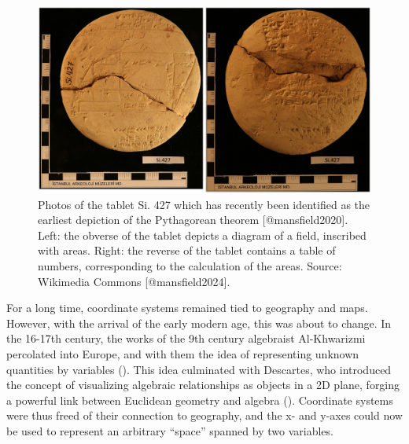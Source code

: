 \documentclass[
]{book}
\theoremstyle{definition}
\theoremstyle{definition}
\theoremstyle{definition}
\theoremstyle{definition}
\theoremstyle{remark}
\begin{document}
\begin{figure}

{\centering \includegraphics[width=1\linewidth,height=1\textheight]{./figures/si427} 

}

\caption{Photos of the tablet Si. 427 which has recently been identified as the earliest depiction of the Pythagorean theorem [@mansfield2020]. Left: the obverse of the tablet depicts a diagram of a field, inscribed with areas. Right: the reverse of the tablet contains a table of numbers, corresponding to the calculation of the areas. Source: Wikimedia Commons [@mansfield2024].}\label{fig:unnamed-chunk-4}
\end{figure}

For a long time, coordinate systems remained tied to geography and maps. However, with the arrival of the early modern age, this was about to change. In the 16-17th century, the works of the 9th century algebraist Al-Khwarizmi percolated into Europe, and with them the idea of representing unknown quantities by variables (). This idea culminated with Descartes, who introduced the concept of visualizing algebraic relationships as objects in a 2D plane, forging a powerful link between Euclidean geometry and algebra (). Coordinate systems were thus freed of their connection to geography, and the x- and y-axes could now be used to represent an arbitrary ``space'' spanned by two variables.
\end{document}
